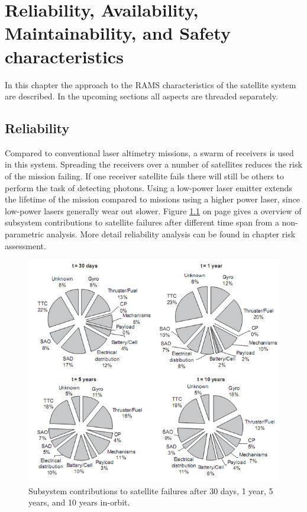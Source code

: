 \chapter{Reliability, Availability, Maintainability, and Safety characteristics}
\label{blRAMS}

In this chapter the approach to the \ac{RAMS} characteristics of the satellite system are described. In the upcoming sections all aspects are threaded separately. 

\section{Reliability}
\label{blRAMSrel}
Compared to conventional laser altimetry missions, a swarm of receivers is used in this system. Spreading the receivers over a number of satellites reduces the risk of the mission failing. If one receiver satellite fails there will still be others to perform the task of detecting photons. Using a low-power laser emitter extends the lifetime of the mission compared to missions using a higher power laser, since low-power lasers generally wear out slower. Figure \ref{R} on page \pageref{R} gives a overview of subsystem contributions to satellite failures after different time span from a non-parametric analysis. More detail reliability analysis can be found in chapter risk assessment.
	\begin{figure} [H]
	\begin{center}
         \includegraphics[width=1.0\textwidth,angle=0]{img/subsystem_reliability_analysis.png}
	\end{center}
	\caption{Subsystem contributions to satellite failures after 30 days, 1 year, 5 years, and 10 years in-orbit.}
	\label{R}
	\end{figure}

